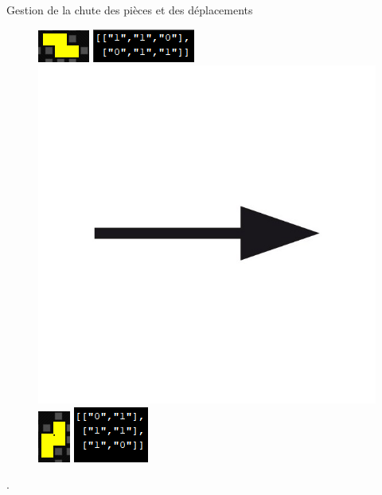 \documentclass{beamer}
\begin{document}
\begin{frame}{Gestion de la chute des pièces et des déplacements}
\begin{enumerate}
\begin{figure}[t]
        	\includegraphics[scale=0.6]{images/exe.PNG}\hfill
        	\includegraphics[scale=0.6]{images/exeConsole.PNG}\hfill
        	\includegraphics[scale=0.04]{images/image.jpg} \hfill 
        	\includegraphics[scale=0.6]{images/rotat.PNG}
        	\includegraphics[scale=0.6]{images/rotatConsole.PNG}\hfill
        	
			\end{figure}.
			
		\end{enumerate}
			
	
	\end{frame}
	
\end{document}
